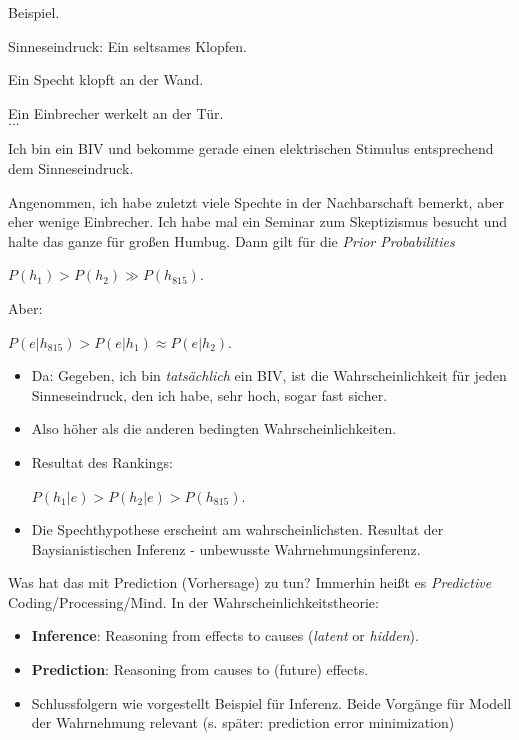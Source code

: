 \documentclass[12pt, handout]{beamer}
\begin{document}
\begin{frame}
  Beispiel.
  \begin{description}[xxxxxxx]
  \item[$e$] {\small Sinneseindruck: Ein seltsames Klopfen.}
  \item[$h_1$] {\small Ein Specht klopft an der Wand.}
  \item[$h_2$] {\small Ein Einbrecher werkelt an der Tür.} \\ $...$
  \item[$h_{815}$] {\small Ich bin ein BIV und bekomme gerade einen
      elektrischen Stimulus entsprechend dem Sinneseindruck.}
  \end{description}

  {\small Angenommen, ich habe zuletzt viele Spechte in der
    Nachbarschaft bemerkt, aber eher wenige Einbrecher. Ich habe mal
    ein Seminar zum Skeptizismus besucht und halte das ganze für
    großen Humbug. Dann gilt für die \emph{Prior Probabilities}}

  \begin{center}
    $P(h_1) > P(h_2) \gg P(h_{815})$.
  \end{center}
\end{frame}

\begin{frame}
  Aber:
  \begin{center}
    $P(e|h_{815}) > P(e|h_1) \approx P(e|h_2)$.
  \end{center}
  \begin{itemize}[<+->]
  \item Da: Gegeben, ich bin \emph{tatsächlich} ein BIV, ist die
    Wahrscheinlichkeit für jeden Sinneseindruck, den ich habe, sehr
    hoch, sogar fast sicher.
  \item Also höher als die anderen bedingten Wahrscheinlichkeiten.
  \item Resultat des Rankings:
    \begin{center}
      $P(h_1|e) > P(h_2|e) > P(h_{815})$.
    \end{center}
  \item Die Spechthypothese erscheint am wahrscheinlichsten. Resultat
    der Baysianistischen Inferenz - unbewusste Wahrnehmungsinferenz.
  \end{itemize}
\end{frame}


\begin{frame}
  Was hat das mit Prediction (Vorhersage) zu tun? Immerhin heißt es \emph{Predictive} Coding/Processing/Mind.
  In der Wahrscheinlichkeitstheorie:
  \begin{itemize}[<+->]
  \item \textbf{Inference}: Reasoning from effects to causes (\emph{latent} or \emph{hidden}).
  \item \textbf{Prediction}: Reasoning from causes to (future) effects.
  \item Schlussfolgern wie vorgestellt Beispiel für Inferenz. Beide Vorgänge für Modell der Wahrnehmung relevant (s. später: prediction error minimization)
  \end{itemize}
\end{frame}
\end{document}
